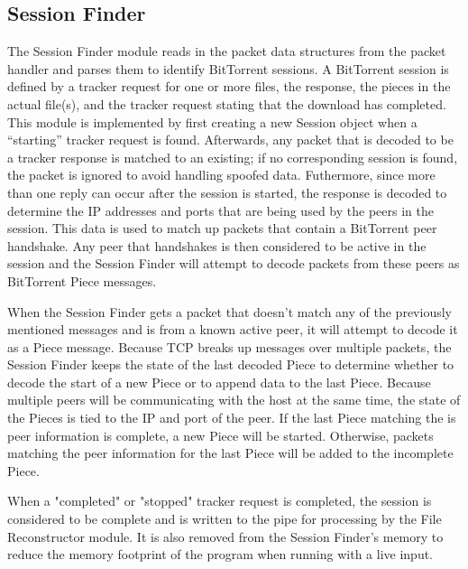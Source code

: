 \documentclass{acm_proc_article-sp}
\begin{document}
\subsection{Session Finder}
The Session Finder module reads in the packet data structures from the packet
handler and parses them to identify BitTorrent sessions. A BitTorrent session is
defined by a tracker request for one or more files, the response, the pieces in
the actual file(s), and the tracker request stating that the download has
completed. This module is implemented by first creating a new Session object
when a ``starting'' tracker request is found. Afterwards, any packet that is
decoded to be a tracker response is matched to an existing; if no corresponding
session is found, the packet is ignored to avoid handling spoofed data.
Futhermore, since more than one reply can occur after the session is started,
the response is decoded to determine the IP addresses and ports that are being
used by the peers in the session. This data is used to match up packets that
contain a BitTorrent peer handshake. Any peer that handshakes is then considered
to be active in the session and the Session Finder will attempt to decode
packets from these peers as BitTorrent Piece messages.

When the Session Finder gets a packet that doesn't match any of the previously
mentioned messages and is from a known active peer, it will attempt to decode it
as a Piece message. Because TCP breaks up messages over multiple packets, the
Session Finder keeps the state of the last decoded Piece to determine whether to
decode the start of a new Piece or to append data to the last Piece. Because
multiple peers will be communicating with the host at the same time, the state
of the Pieces is tied to the IP and port of the peer. If the last Piece matching
the is peer information is complete, a new Piece will be started. Otherwise,
packets matching the peer information for the last Piece will be added to the
incomplete Piece.

When a "completed" or "stopped" tracker request is completed, the session is
considered to be complete and is written to the pipe for processing by the File
Reconstructor module. It is also removed from the Session Finder's memory to
reduce the memory footprint of the program when running with a live input.
\end{document}
